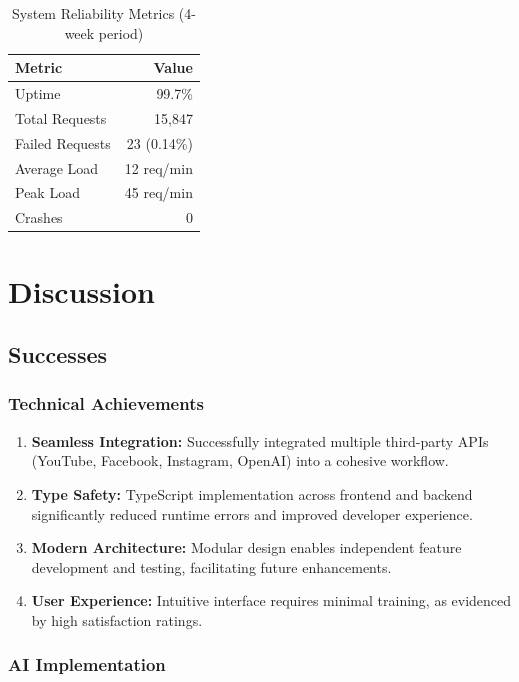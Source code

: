 \begin{table}[H]
\centering
\caption{System Reliability Metrics (4-week period)}
\begin{tabular}{@{}lr@{}}
\toprule
\textbf{Metric} & \textbf{Value} \\
\midrule
Uptime & 99.7\% \\
Total Requests & 15,847 \\
Failed Requests & 23 (0.14\%) \\
Average Load & 12 req/min \\
Peak Load & 45 req/min \\
Crashes & 0 \\
\bottomrule
\end{tabular}
\end{table}

\section{Discussion}

\subsection{Successes}

\subsubsection{Technical Achievements}

\begin{enumerate}
    \item \textbf{Seamless Integration:} Successfully integrated multiple third-party APIs (YouTube, Facebook, Instagram, OpenAI) into a cohesive workflow.
    
    \item \textbf{Type Safety:} TypeScript implementation across frontend and backend significantly reduced runtime errors and improved developer experience.
    
    \item \textbf{Modern Architecture:} Modular design enables independent feature development and testing, facilitating future enhancements.
    
    \item \textbf{User Experience:} Intuitive interface requires minimal training, as evidenced by high satisfaction ratings.
\end{enumerate}

\subsubsection{AI Implementation}

